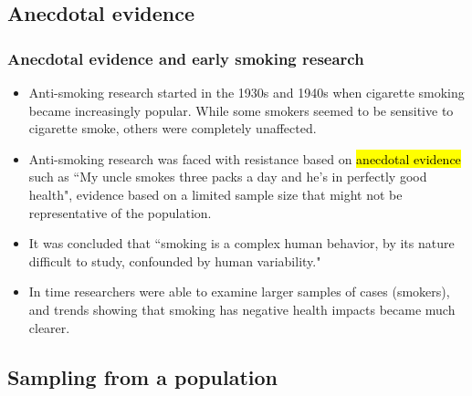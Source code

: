 \documentclass[slidestop,compress,mathserif]{beamer}
\begin{document}

\subsection{Anecdotal evidence}


\begin{frame}
	\frametitle{Anecdotal evidence and early smoking research}

	\begin{itemize}

	\item Anti-smoking research started in the 1930s and 1940s when cigarette smoking became increasingly popular. While some smokers seemed to be sensitive to cigarette smoke, others were completely unaffected.

	\item Anti-smoking research was faced with resistance based on \hl{anecdotal evidence} such as ``My uncle smokes three packs a day and he's in perfectly good health", evidence based on a limited sample size that might not be representative of the population.

	\item It was concluded that ``smoking is a complex human behavior, by its nature difficult to study, confounded by human variability."

	\item In time researchers were able to examine larger samples of cases (smokers), and trends showing that smoking has negative health impacts became much clearer.

	\end{itemize}


\end{frame}


\subsection{Sampling from a population}

\end{document}
